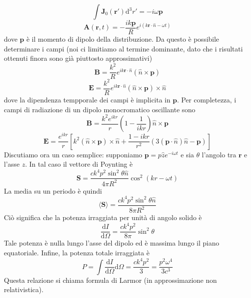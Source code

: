 \documentclass[a4paper,11pt]{book}
\newcommand{\dif}{\mathrm{d}}
\renewcommand{\vec}[1]{\mathbf{#1}}
\theoremstyle{theorem}
\theoremstyle{definition}
\begin{document}
\[\int\vec{J}_0(\vec{r}')\dif^3r'=-i\omega\vec{p}\]
\[\vec{A}(\vec{r},t)=-\frac{ik\vec{p}}{R}e^{i(k\vec{r}\cdot\hat{n}-\omega t)}\]
dove $\vec{p}$ è il momento di dipolo della distribuzione. Da questo è possibile determinare i campi (noi ci limitiamo al termine dominante, dato che i risultati ottenuti finora sono già piuttosto approssimativi)
\[\vec{B}=\frac{k^2}{R}e^{ik\vec{r}\cdot\hat{n}}(\hat{n}\times\vec{p})\]
\[\vec{E}=\frac{k^2}{R}e^{ik\vec{r}\cdot\hat{n}}(\hat{n}\times\vec{p})\times\hat{n}\]
dove la dipendenza tempporale dei campi è implicita in $\vec{p}$. Per completezza, i campi di radiazione di un dipolo monocromatico oscillante sono
\[\vec{B}=\frac{k^2e^{ikr}}{r}\left(1-\frac{1}{ikr}\right)\hat{n}\times\vec{p}\]
\[\vec{E}=\frac{e^{ikr}}{r}\left[k^2(\hat{n}\times\vec{p})\times\hat{n}+\frac{1-ikr}{r^2}\left(3(\vec{p}\cdot\hat{n})\hat{n}-\vec{p}\right)\right]\]
Discutiamo ora un caso semplice: supponiamo $\vec{p}=p\hat{z}e^{-i\omega t}$ e sia $\theta$ l'angolo tra $\vec{r}$ e l'asse $z$. In tal caso il vettore di Poynting è 
\[\vec{S}=\frac{ck^4p^2\sin^2\theta\hat{n}}{4\pi R^2}\cos^2(kr-\omega t)\]
La media su un periodo è quindi
\[\langle\vec{S}\rangle=\frac{ck^4p^2\sin^2\theta\hat{n}}{8\pi R^2}\]
Ciò significa che la potenza irraggiata per unità di angolo solido è
\[\frac{\dif I}{\dif\Omega}=\frac{ck^4p^2}{8\pi}\sin^2\theta\]
Tale potenza è nulla lungo l'asse del dipolo ed è massima lungo il piano equatoriale. Infine, la potenza totale irraggiata è
\[P=\int\frac{\dif I}{\dif\Omega}\dif\Omega=\frac{ck^4p^2}{3}=\frac{p^2\omega^4}{3c^3}\]
Questa relazione si chiama formula di Larmor (in approssimazione non relativistica).
\end{document}
